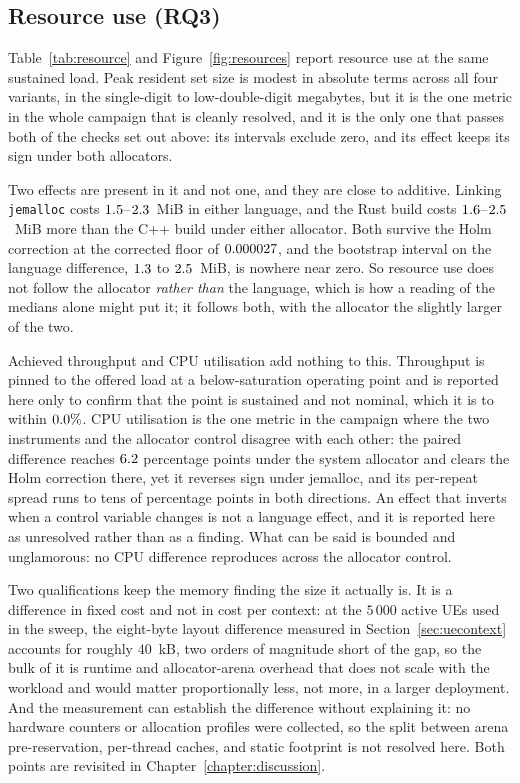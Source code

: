 \documentclass[english,twoside,openright,a4paper,censored,csm,software-track-2020]{HYthesisML}
\begin{document}
\subsection{Resource use (RQ3)}\label{sec:resources}
Table~\ref{tab:resource} and Figure~\ref{fig:resources} report resource use at the same
sustained load. Peak resident set size is modest in absolute terms across all four variants, in
the single-digit to low-double-digit megabytes, but it is the one metric in the whole campaign
that is cleanly resolved, and it is the only one that passes both of the checks set out above:
its intervals exclude zero, and its effect keeps its sign under both allocators.

Two effects are present in it and not one, and they are close to additive. Linking
\texttt{jemalloc} costs $1.5$--$2.3$~MiB in either language, and the
Rust build costs $1.6$--$2.5$~MiB more than the C++ build under either
allocator. Both survive the Holm correction at the corrected floor of $0.000027$, and the
bootstrap interval on the language difference, $1.3$ to $2.5$~MiB, is nowhere
near zero. So resource use does not follow the allocator \emph{rather than} the language, which
is how a reading of the medians alone might put it; it follows both, with the allocator the
slightly larger of the two.

Achieved throughput and CPU utilisation add nothing to this. Throughput is pinned to the
offered load at a below-saturation operating point and is reported here only to confirm that
the point is sustained and not nominal, which it is to within $0.0\%$. CPU
utilisation is the one metric in the campaign where the two instruments and the allocator
control disagree with each other: the paired difference reaches $6.2$ percentage
points under the system allocator and clears the Holm correction there, yet it reverses sign
under jemalloc, and its per-repeat spread runs to tens of percentage points in both directions.
An effect that inverts when a control variable changes is not a language effect, and it is
reported here as unresolved rather than as a finding. What can be said is bounded and
unglamorous: no CPU difference reproduces across the allocator control.

Two qualifications keep the memory finding the size it actually is. It is a difference in fixed
cost and not in cost per context: at the $5\,000$ active UEs used in the sweep, the
eight-byte layout difference measured in Section~\ref{sec:uecontext} accounts for roughly
$40$~kB, two orders of magnitude short of the gap, so the bulk of it is runtime and
allocator-arena overhead that does not scale with the workload and would matter proportionally
less, not more, in a larger deployment. And the measurement can establish the difference
without explaining it: no hardware counters or allocation profiles were collected, so the split
between arena pre-reservation, per-thread caches, and static footprint is not resolved here.
Both points are revisited in Chapter~\ref{chapter:discussion}.
\end{document}
